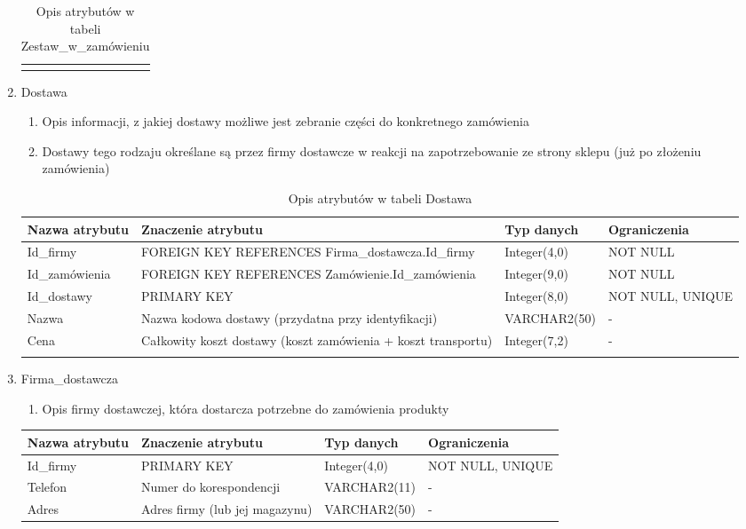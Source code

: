 \begin{enumerate}
{\begin{longtable}{|p{3cm}|p{5cm}|p{2.5cm}|p{2.5cm}|}
  	\hline
	\caption{Opis atrybutów w tabeli Zestaw\_w\_zamówieniu}
	\end{longtable}}
  \item Dostawa
  	\begin{enumerate}
  	  \item Opis informacji, z jakiej dostawy możliwe jest zebranie części do
  	  konkretnego zamówienia
  	  \item Dostawy tego rodzaju określane są przez firmy dostawcze w reakcji na
  	  zapotrzebowanie ze strony sklepu (już po złożeniu zamówienia)
  	\end{enumerate}
  	{\footnotesize
  	\begin{longtable}{|p{3cm}|p{5cm}|p{2.5cm}|p{2.5cm}|}
  	\hline
  	\textbf{Nazwa atrybutu} & \textbf{Znaczenie atrybutu} & \textbf{Typ danych} &
  	\textbf{Ograniczenia} \\
  	\hline
  	Id\_firmy & FOREIGN KEY REFERENCES Firma\_dostawcza.Id\_firmy & Integer(4,0)
  	& NOT NULL \\
  	\hline
  	Id\_zamówienia & FOREIGN KEY REFERENCES
  	Zamówienie.Id\_zamówienia & Integer(9,0) & NOT NULL
  	\\
  	\hline
  	Id\_dostawy & PRIMARY KEY & Integer(8,0) & NOT NULL, UNIQUE  \\
  	\hline
  	Nazwa & Nazwa kodowa dostawy (przydatna przy identyfikacji) & VARCHAR2(50) &
  	-
  	\\
  	\hline
  	Cena & Całkowity koszt dostawy (koszt zamówienia + koszt transportu) & 
  	Integer(7,2) & -
  	\\
  	\hline
	\caption{Opis atrybutów w tabeli Dostawa}
	\end{longtable}}
  \item Firma\_dostawcza
  	\begin{enumerate}
  	  \item Opis firmy dostawczej, która dostarcza potrzebne do zamówienia
  	  produkty
  	\end{enumerate}
  	{\footnotesize
  	\begin{longtable}{|p{3cm}|p{5cm}|p{2.5cm}|p{2.5cm}|}
  	\hline
  	\textbf{Nazwa atrybutu} & \textbf{Znaczenie atrybutu} & \textbf{Typ danych} &
  	\textbf{Ograniczenia} \\
  	\hline
  	Id\_firmy & PRIMARY KEY  & Integer(4,0) & NOT NULL, UNIQUE \\
  	\hline
  	Telefon & Numer do korespondencji & VARCHAR2(11) & -  \\
  	\hline
  	Adres & Adres firmy (lub jej magazynu) & VARCHAR2(50) & -  \\

\end{longtable}}
\end{enumerate}
